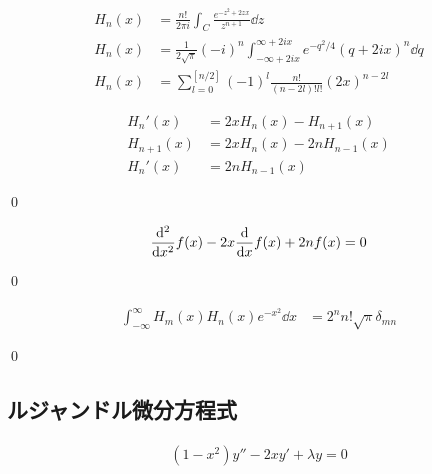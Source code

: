 \documentclass[uplatex,dvipdfmx,a4paper,11pt]{jlreq}
\makeatletter
\theoremstyle{definition}
\renewenvironment{proof}[1][\proofname]{\par
  \normalfont
  \topsep6\p@\@plus6\p@ \trivlist
  \item[\hskip\labelsep{\bfseries #1}\@addpunct{\bfseries}]\ignorespaces\quad\par
}{%
  \qed\endtrivlist\@endpefalse
}
\renewcommand\proofname{証明}
\makeatother
\begin{document}
\begin{proposition}
  \begin{align}
    H_n(x) & = \frac{n!}{2\pi i}\int_C\frac{e^{-z^2 + 2zx}}{z^{n+1}}\dd{z}                               \\
    H_n(x) & = \frac{1}{2\sqrt{\pi}}(-i)^n\int_{-\infty + 2ix}^{\infty + 2ix}e^{-q^2/4}(q + 2ix)^n\dd{q} \\
    H_n(x) & = \sum_{l=0}^{[n/2]}(-1)^l\frac{n!}{(n - 2l)!l!}(2x)^{n - 2l}
  \end{align}
\end{proposition}

\begin{proposition}
  \begin{align}
    H_n'(x)    & = 2xH_n(x) - H_{n+1}(x)   \\
    H_{n+1}(x) & = 2xH_n(x) - 2nH_{n-1}(x) \\
    H_n'(x)    & = 2nH_{n-1}(x)
  \end{align}
\end{proposition}
\begin{proof}

\end{proof}

\begin{theorem}
  \begin{align}
    \dv[2]{x}f(x) - 2x\dv{x}f(x) + 2nf(x) = 0
  \end{align}
\end{theorem}
\begin{proof}

\end{proof}

\begin{theorem}
  \begin{align}
    \int_{-\infty}^\infty H_m(x)H_n(x)e^{-x^2}\dd{x} & = 2^nn!\sqrt{\pi}\delta_{mn}
  \end{align}
\end{theorem}
\begin{proof}

\end{proof}


\subsection{ルジャンドル微分方程式}
\begin{definition}[ルジャンドル微分方程式]
  \begin{align}
    (1 - x^2)y'' - 2xy' + \lambda y = 0
  \end{align}
\end{definition}
\end{document}
